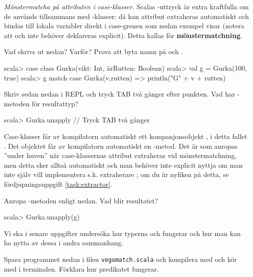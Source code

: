 \Task \label{task:match-caseclass} \emph{Mönstermatcha på attributen i case-klasser.} Scalas -uttryck är extra kraftfulla om de används tillsammans med -klasser: då kan attribut extraheras automatiskt och bindas till lokala variabler direkt i case-grenen som nedan exempel visar (notera att  och  inte behöver deklareras explicit). Detta kallas för \textbf{mönstermatchning}.  

\Subtask \label{subtask:autobinding-match} Vad skrivs ut nedan? Varför? Prova att byta namn på  och .
\begin{REPL}
scala> case class Gurka(vikt: Int, ärRutten: Boolean)
scala> val g = Gurka(100, true)
scala> g match { case Gurka(v,rutten) => println("G" + v + rutten) }
\end{REPL}

\Subtask Skriv sedan nedan i REPL och tryck TAB två gånger efter punkten. Vad har -metoden för resultattyp?  
\begin{REPL}
scala> Gurka.unapply   // Tryck TAB två gånger
\end{REPL}
\begin{Background}
Case-klasser får av kompilatorn automatiskt ett kompanjonsobjekt , i detta fallet . Det objektet får av kompilatorn automatiskt en -metod. Det är  som anropas ''under huven'' när case-klassernas attribut extraheras vid mönstermatchning, men detta sker alltså automatiskt och man behöver inte explicit nyttja  om man inte själv vill implementera s.k. extraherare ; om du är nyfiken på detta, se fördjupningsuppgift \ref{task:extractor}.
\end{Background}

\Subtask Anropa -metoden enligt nedan. Vad blir resultatet?
\begin{REPL}
scala> Gurka.unapply(g)   
\end{REPL}
Vi ska i senare uppgifter undersöka hur typerna  och  fungerar och hur man kan ha nytta av dessa i andra sammanhang.

\Subtask Spara programmet nedan i filen \texttt{vegomatch.scala} och kompilera med  och kör med  i terminalen. Förklara hur predikatet  fungerar. 



